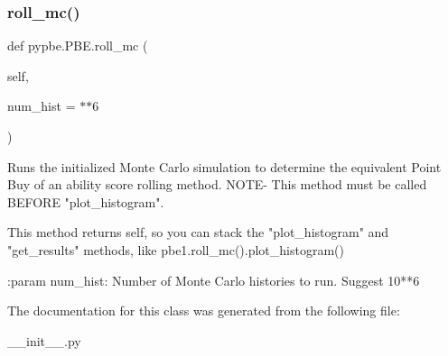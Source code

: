\subsubsection{\texorpdfstring{roll\+\_\+mc()}{roll\_mc()}}
{\footnotesize\ttfamily def pypbe.\+P\+B\+E.\+roll\+\_\+mc (\begin{DoxyParamCaption}\item[{}]{self,  }\item[{}]{num\+\_\+hist = {$\ast$$\ast$6} }\end{DoxyParamCaption})}

\begin{DoxyVerb}Runs the initialized Monte Carlo simulation to determine the equivalent
Point Buy of an ability score rolling method. NOTE- This method must
be called BEFORE "plot_histogram".

This method returns self, so you can stack the "plot_histogram" and
"get_results" methods, like pbe1.roll_mc().plot_histogram()

:param num_hist: Number of Monte Carlo histories to run. Suggest 10**6
\end{DoxyVerb}
 

The documentation for this class was generated from the following file\+:\begin{DoxyCompactItemize}
\item 
\+\_\+\+\_\+init\+\_\+\+\_\+.\+py\end{DoxyCompactItemize}
